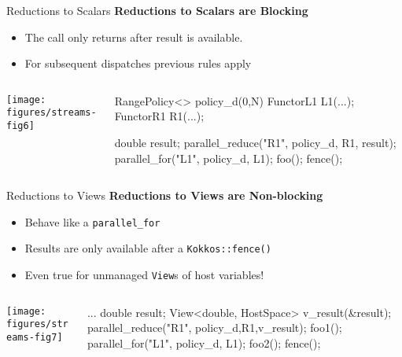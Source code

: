 
\begin{frame}[fragile]{Reductions to Scalars}
  \textbf{Reductions to Scalars are Blocking}
  \begin{itemize}
    \item{The call only returns after result is available.}
    \item{For subsequent dispatches previous rules apply}
  \end{itemize}

  \begin{columns}[]
    \begin{column}{.67\textwidth}

       \texttt{[image: figures/streams-fig6]} 
 
    \end{column}

    \begin{column}{.33\textwidth}
	    \begin{code}[linebackgroundcolor={},keywords={L1,L2,policy_device}]
RangePolicy<> 
  policy_d(0,N)
FunctorL1 L1(...);
FunctorR1 R1(...);

double result;
parallel_reduce("R1", 
  policy_d, R1, result);
parallel_for("L1", 
  policy_d, L1);
foo();
fence();
      \end{code}
    \end{column}
  \end{columns}
\end{frame}


\begin{frame}[fragile]{Reductions to Views}
  \textbf{Reductions to Views are Non-blocking}
  \begin{itemize}
    \item{Behave like a \texttt{parallel\_for}}
    \item{Results are only available after a \texttt{Kokkos::fence()}}
    \item{Even true for unmanaged \texttt{View}s of host variables!}
  \end{itemize}

  \begin{columns}[]
    \begin{column}{.67\textwidth}

       \texttt{[image: figures/streams-fig7]} 
 
    \end{column}

    \begin{column}{.33\textwidth}
    \begin{code}[linebackgroundcolor={},keywords={L1,L2,policy_device}]
...
double result;
View<double, HostSpace>
  v_result(&result);
parallel_reduce("R1", 
  policy_d,R1,v_result);
foo1();
parallel_for("L1", 
  policy_d, L1);
foo2();
fence();
      \end{code}
    \end{column}
  \end{columns}
\end{frame}

